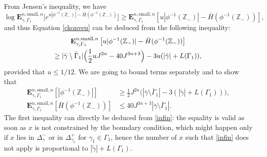 \documentclass[10pt]{amsart}
\numberwithin{equation}{section}
\theoremstyle{plain}
\theoremstyle{definition}
\newcommand{\sm}{\mathrm{small}}
\newcommand{\bE}{{\ensuremath{\mathbf E}} }
\newcommand{\bbZ}{{\ensuremath{\mathbb Z}} }
\newcommand{\gG}{\Gamma}
\begin{document}
From Jensen's inequality, we have
\begin{equation*}
\log \bE^{n,\sm,n}_{\gamma,\gG_1}\bigl[e^{u|\phi^{-1}(\bbZ_-)|-\bar H(\phi^{-1}(\bbZ_-))}\bigr]
\ge \bE^{n,\sm,n}_{\gamma,\gG_1}\left[u|\phi^{-1}(\bbZ_-)|-\bar H(\phi^{-1}(\bbZ_-))\right],
\end{equation*}
and thus Equation \eqref{ckonveu}
can be deduced from the following inequality:
\begin{multline*}
\bE^{n,\sm,n}_{\gamma,\gG_1}\left[u|\phi^{-1}(\bbZ_-)|-\bar H(\phi^{-1}(\bbZ_-))\right]\\
\ge
|\bar \gamma \setminus \bar \gG_1|\Bigl(\frac{1}{2}u J^{2n}-40J^{3n+3}\Bigr)-3u(|\tilde \gamma|+L(\gG_1)),
\end{multline*}
provided that $u\le 1/12$.
We are going to bound terms separately and to show that%
\begin{equation}\label{lixiout}\begin{split}
\bE^{n,\sm,n}_{\gamma,\gG_1}\left[|\phi^{-1}(\bbZ_-)| \right]&\ge
\frac{1}{2}J^{2n}\bigl(|\bar \gamma\setminus\bar \gG_1|-3(|\tilde \gamma|+L(\gG_1))\bigr),\\
\bE^{n,\sm,n}_{\gamma,\gG_1}\left[\bar H(\phi^{-1}(\bbZ_-)) \right]&\le 40 J^{3n+3}|\bar \gamma\setminus\bar \gG_1|.
\end{split}\end{equation}
The first inequality can directly be deduced from \eqref{infin}: the equality is valid as soon as $x$ is not constrained by the boundary condition,
which might happen only if $x$ lies in $\Delta^-_{\gamma}$ or in $\Delta^+_{\gamma_1}$ for $\gamma_1\in \gG_1$,
hence the number of $x$ such that \eqref{infin} does not apply is proportional to $|\tilde \gamma|+L(\gG_1)$.
\end{document}
